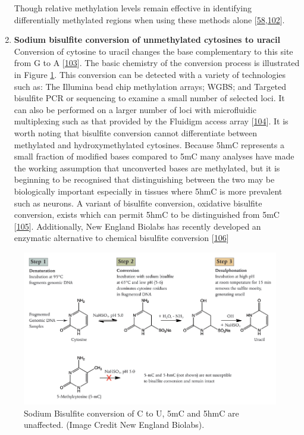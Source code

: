 \documentclass[
]{book}
\begin{document}
\begin{enumerate}
  Though relative methylation levels remain effective in identifying differentially methylated regions when using these methods alone {[}\protect\hyperlink{ref-Maunakea2010}{58},\protect\hyperlink{ref-Bock2010}{102}{]}.
\item
  \textbf{Sodium bisulfite conversion of unmethylated cytosines to uracil}
  Conversion of cytosine to uracil changes the base complementary to this site from G to A {[}\protect\hyperlink{ref-Hayatsu1970}{103}{]}.
  The basic chemistry of the conversion process is illustrated in Figure \ref{fig:BisulfiteConversionNEB}.
  This conversion can be detected with a variety of technologies such as:
  The Illumina bead chip methylation arrays; WGBS; and Targeted bisulfite PCR or sequencing to examine a small number of selected loci.
  It can also be performed on a larger number of loci with microfluidic multiplexing such as that provided by the Fluidigm access array {[}\protect\hyperlink{ref-Adamowicz2018}{104}{]}.
  It is worth noting that bisulfite conversion cannot differentiate between methylated and hydroxymethylated cytosines.
  Because 5hmC represents a small fraction of modified bases compared to 5mC many analyses have made the working assumption that unconverted bases are methylated, but it is beginning to be recognised that distinguishing between the two may be biologically important especially in tissues where 5hmC is more prevalent such as neurons.
  A variant of bisulfite conversion, oxidative bisulfite conversion, exists which can permit 5hmC to be distinguished from 5mC {[}\protect\hyperlink{ref-Skvortsova2017}{105}{]}.
  Additionally, New England Biolabs has recently developed an enzymatic alternative to chemical bisulfite conversion {[}\protect\hyperlink{ref-Williams2019}{106}{]}
\end{enumerate}

\begin{figure}

{\centering \includegraphics[width=0.8\linewidth]{figs/BisulfiteConversionNEB} 

}

\caption{Sodium Bisulfite conversion of C to U, 5mC and 5hmC are unaffected. (Image Credit New England Biolabs).}\label{fig:BisulfiteConversionNEB}
\end{figure}
\end{document}
